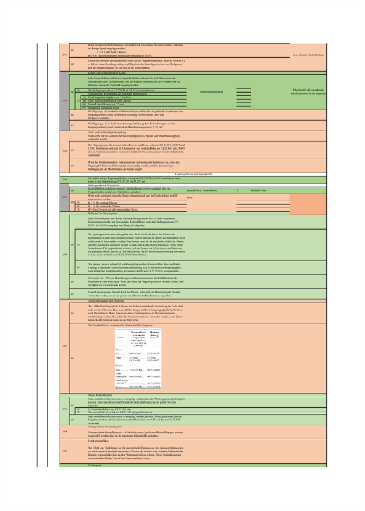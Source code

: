 \begin{table}[H]
\centering
\includegraphics[width=1.0\textwidth, trim={19mm 19mm 19mm 19mm}, clip]{bilder/Tabellen/MPP_Konstruktion_4.pdf}
\end{table}

